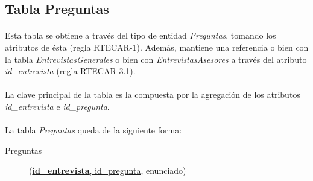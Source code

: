    \subsection{Tabla Preguntas}

      \paragraph{}Esta tabla se obtiene a través del tipo de entidad
      \textit{Preguntas}, tomando los atributos de ésta (regla RTECAR-1).
      Además, mantiene una referencia o bien con la tabla
      \textit{EntrevistasGenerales} o bien con \textit{EntrevistasAsesores }a
      través del atributo \textit{id\_entrevista} (regla RTECAR-3.1).

      \paragraph{}La clave principal de la tabla es la compuesta por la
      agregación de los atributos \textit{id\_entrevista} e
      \textit{id\_pregunta}.

      \paragraph{}La tabla \textit{Preguntas} queda de la siguiente forma:

      \begin{description}
         \item[Preguntas] \begin{flushleft}(\underline{\textbf{id\_entrevista},
         id\_pregunta}, enunciado)\end{flushleft}
      \end{description}
